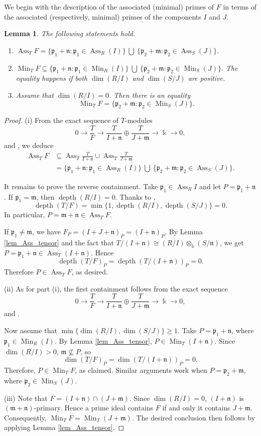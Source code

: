 \documentclass{amsart}
\DeclareMathOperator{\Ass}{Ass}
\DeclareMathOperator{\depth}{depth}
\DeclareMathOperator{\Min}{Min}
\newcommand{\mm}{\mathfrak{m}}
\newcommand{\nn}{\mathfrak{n}}
\newcommand{\pp}{\mathfrak{p}}
\theoremstyle{plain}
\newtheorem{lem}[thm]{Lemma}
\theoremstyle{definition}
\numberwithin{equation}{section}
\newcommand{\kk}{\Bbbk}
\begin{document}
We begin with the description of the associated (minimal) primes of $F$ in terms of the associated (respectively, minimal) primes of the components $I$ and $J$.
\begin{lem}
\label{lem_AssMin_F}
The following statements hold.
\begin{enumerate}[\quad \rm (i)]
\item 
$\Ass_T F = \{\pp_1+\nn: \pp_1 \in \Ass_R(I)\} ~ \bigcup ~ \{\pp_2+\mm: \pp_2 \in \Ass_S(J)\}.$
\item 
$\Min_T F \subseteq  \{\pp_1+\nn: \pp_1 \in \Min_R(I)\} ~ \bigcup ~ \{\pp_2+\mm: \pp_2 \in \Min_S(J)\}.$
The equality happens if both $\dim(R/I)$ and $\dim(S/J)$ are positive.
\item Assume that $\dim(R/I)=0$. Then there is an equality
$$\Min_T F = \{\pp_2+\mm: \pp_2 \in \Min_S(J)\}.$$
\end{enumerate}
\end{lem}
\begin{proof}

(i) From the exact sequence of $T$-modules
\[
0\to \frac{T}{F} \to \frac{T}{I+\nn} \oplus \frac{T}{J+\mm} \to \kk \to 0,
\]
and , we deduce
\begin{align*}
\Ass_T F & \subseteq \Ass_T \frac{T}{I+\nn} \cup \Ass_T \frac{T}{J+\mm} \\
        &= \{\pp_1+\nn: \pp_1 \in \Ass_R(I)\} ~ \bigcup ~ \{\pp_2+\mm: \pp_2 \in \Ass_S(J)\}.
\end{align*}

It remains to prove the reverse containment. Take $\pp_1\in \Ass_R I$ and let $P=\pp_1+\nn$. If $\pp_1=\mm$, then $\depth(R/I)=0$. Thanks to ,
\[
\depth(T/F)=\min\{1,\depth(R/I),\depth(S/J)\}=0.
\]
In particular, $P=\mm+\nn \in \Ass_T F$.

If $\pp_1 \neq \mm$, we have $F_P=(I+J+\nn)_P=(I+\nn)_P$. By Lemma \ref{lem_Ass_tensor} and the fact that $T/(I+\nn) \cong (R/I)\otimes_\kk (S/\nn)$, we get $P=\pp_1+\nn \in \Ass_T(I+\nn)$. Hence
\[
\depth (T/F)_P=\depth (T/(I+\nn))_P=0.
\]
Therefore $P \in \Ass_T F$, as desired.


(ii) As for part (i), the first containment follows from the exact sequence
\[
0\to \frac{T}{F} \to \frac{T}{I+\nn} \oplus \frac{T}{J+\mm} \to \kk \to 0,
\]
and .

Now assume that $\min\{\dim(R/I),\dim(S/J)\}\ge 1$. Take $P=\pp_1+\nn$, where $\pp_1\in \Min_R(I)$. By Lemma \ref{lem_Ass_tensor}, $P\in \Min_T(I+\nn)$. Since $\dim(R/I)>0$, $\mm \not\subseteq P$, so 
$$
\dim (T/F)_P=\dim (T/(I+\nn))_P=0.
$$
Therefore, $P\in \Min_T F$, as claimed. Similar arguments work when $P=\pp_2+\mm$, where $\pp_2\in \Min_S(J)$.

(iii) Note that $F=(I+\nn)\cap (J+\mm)$. Since $\dim(R/I)=0$, $(I+\nn)$ is $(\mm+\nn)$-primary. Hence a prime ideal contains $F$ if and only it contains $J+\mm$. Consequently, $\Min_T F=\Min_T (J+\mm)$. The desired conclusion then follows by applying Lemma \ref{lem_Ass_tensor}.
\end{proof}
\end{document}

